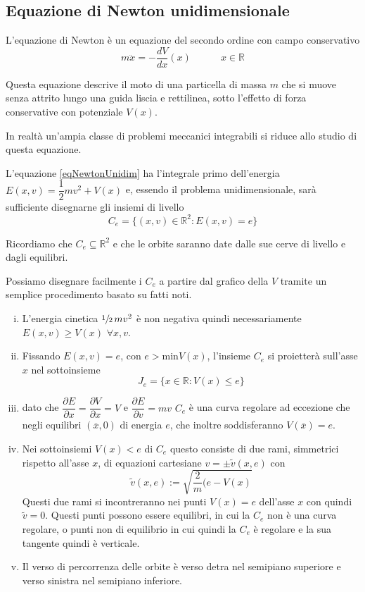 \documentclass[11pt,a4paper,twoside]{book}
\theoremstyle{esss}
\theoremstyle{dotless}
\numberwithin{equation}{section} %
\begin{document}
\subsection{Equazione di Newton unidimensionale}\label{subsezNewton1}

L'equazione di Newton è un equazione del secondo ordine con campo conservativo
\begin{equation}\label{eqNewtonUnidim}
m\ddot{x}=-\dfrac{dV}{dx}(x) \qquad \quad x\in\mathbb{R}
\end{equation}

Questa equazione descrive il moto di una particella di massa $m$ che si muove senza attrito lungo una guida liscia e rettilinea, sotto l'effetto di forza conservative con potenziale $V(x)$.

In realtà un'ampia classe di problemi meccanici integrabili si riduce allo studio di questa equazione.

L'equazione \eqref{eqNewtonUnidim} ha l'integrale primo dell'energia $E(x,v)=\dfrac{1}{2}mv^2+V(x)$ e, essendo il problema unidimensionale, sarà sufficiente disegnarne gli insiemi di livello
\[
C_e=\{(x,v)\in\mathbb{R}^2:E(x,v)=e\}
\]

Ricordiamo che $C_e\subseteq \mathbb{R}^{2}$ e che le orbite saranno date dalle sue cerve di livello e dagli equilibri.


Possiamo disegnare facilmente i $C_e$ a partire dal grafico della $V$ tramite un semplice procedimento basato su fatti noti. 
\begin{enumerate}[i.]
\item L'energia cinetica $\sfrac{1}{2}\,mv^2$ è non negativa quindi necessariamente $E(x,v)\geq V(x)$ $\forall x,v$. 
\item Fissando $E(x,v)=e$, con $e>\text{min}V(x)$, l'insieme $C_e$ si proietterà sull'asse $x$ nel sottoinsieme
\[
J_e=\{ x\in\mathbb{R}:V(x)\leq e \}
\]
\item dato che $\dfrac{\partial E}{\partial x}=\dfrac{\partial V}{\partial x}=V$ e $\dfrac{\partial E}{\partial v}=mv$ $C_e$ è una curva regolare ad eccezione che negli equilibri $(\overline{x},0)$ di energia $e$, che inoltre soddisferanno $V(\overline{x})=e$.
\item Nei sottoinsiemi $V(x)<e$ di $C_e$ questo consiste di due rami, simmetrici rispetto all'asse $x$, di equazioni cartesiane $v=\pm \tilde{v}(x,e)$ con
\begin{equation}
\tilde{v}(x,e):=\sqrt{\dfrac{2}{m}(e-V(x)}
\end{equation}
Questi due rami si incontreranno nei punti $V(x)=e$ dell'asse $x$ con quindi $\tilde{v}=0$. Questi punti possono essere equilibri, in cui la $C_e$ non è una curva regolare, o punti non di equilibrio in cui quindi la $C_e$ è regolare e la sua tangente quindi è verticale.
\item Il verso di percorrenza delle orbite è verso detra nel semipiano superiore e verso sinistra nel semipiano inferiore.
\end{enumerate}
\end{document}
